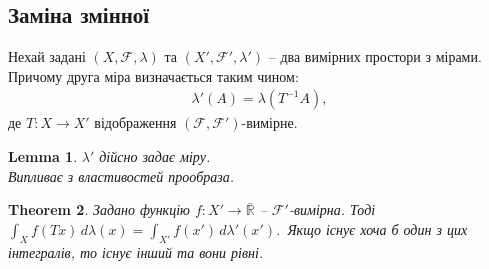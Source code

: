 \documentclass[a4paper, 10pt]{article}
\theoremstyle{theoremdd}
\newtheorem{theorem}{Theorem}[subsection]
\newtheorem{lemma}[theorem]{Lemma}
\begin{document}
\subsection{Заміна змінної}
Нехай задані $(X,\mathcal{F}, \lambda)$ та $(X',\mathcal{F}', \lambda')$ -- два вимірних простори з мірами. Причому друга міра визначається таким чином:
\begin{align*}
\lambda'(A) = \lambda(T^{-1}A),
\end{align*}
де $T \colon X \to X'$ відображення $(\mathcal{F},\mathcal{F}')$-вимірне.

\begin{lemma}
$\lambda'$ дійсно задає міру.\\
\textit{Випливає з властивостей прообраза.}
\end{lemma}

\begin{theorem}
Задано функцію $f \colon X' \to \bar{\mathbb{R}}$ -- $\mathcal{F}'$-вимірна. Тоді $\displaystyle\int_X f(Tx)\,d\lambda(x) = \int_{X'}f(x')\,d\lambda'(x')$.\
Якщо існує хоча б один з цих інтегралів, то існує інший та вони рівні.
\end{theorem}
\end{document}
